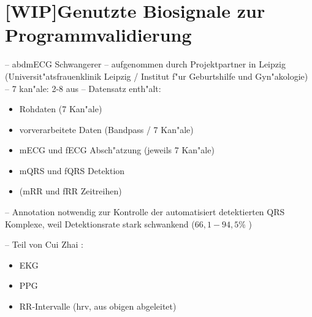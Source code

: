 
\section{[WIP]Genutzte Biosignale zur Programmvalidierung}
\label{sec:genutzte_biosignale}

-- abdmECG Schwangerer
-- aufgenommen durch Projektpartner in Leipzig (Universit"atsfrauenklinik Leipzig / Institut f"ur Geburtshilfe und Gyn"akologie)
-- 7 kan"ale: 2-8 aus \cite{Zaunseder2012}
-- Datensatz enth"alt: 
\begin{itemize}
	\item Rohdaten (7 Kan"ale)
	\item vorverarbeitete Daten (Bandpass / 7 Kan"ale)
	\item mECG und fECG Absch"atzung (jeweils 7 Kan"ale)
	\item mQRS und fQRS Detektion
	\item (mRR und fRR Zeitreihen)
\end{itemize}
-- Annotation notwendig zur Kontrolle der automatisiert detektierten QRS Komplexe, weil Detektionsrate stark schwankend ($66,1 - 94,5$\% \cite{Zaunseder2012})

-- Teil von Cui Zhai \cite{Zhai2012}:
\begin{itemize}
	\item \ac{EKG}
	\item \ac{PPG}
	\item RR-Intervalle (\ac{hrv}, aus obigen abgeleitet)
\end{itemize}


